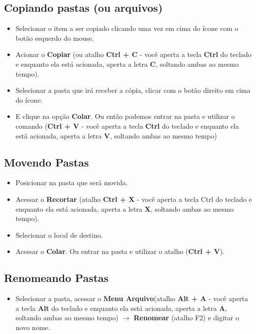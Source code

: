 \documentclass[hidelinks,12pt]{article}
\begin{document}
\subsection{Copiando pastas (ou arquivos)}

\begin{itemize}

	\item Selecionar o item a ser copiado clicando uma vez em cima do ícone com o botão esquerdo do mouse.
	\item Acionar o {\bf Copiar} (ou atalho {\bf Ctrl + C} - você aperta a tecla \textbf{Ctrl} do teclado e enquanto ela está acionada, aperta a letra {\bf C}, soltando ambas ao mesmo tempo).
	\item Selecionar a pasta que irá receber a cópia, clicar com o botão direito em cima do ícone.
	\item E clique na opção {\bf Colar}. Ou então podemos entrar na pasta e utilizar o comando ({\bf Ctrl + V} - você aperta a tecla {\bf Ctrl} do teclado e enquanto ela está acionada, aperta a letra {\bf V}, soltando ambas ao mesmo tempo)
\end{itemize}

\subsection{Movendo Pastas}

\begin{itemize}
	\item Posicionar na pasta que será movida.
	\item Acessar o {\bf Recortar} (atalho {\bf Ctrl + X} - você aperta a tecla Ctrl do teclado e enquanto ela está acionada, aperta a letra {\bf X}, soltando ambas ao mesmo tempo).
	\item Selecionar o local de destino.
	\item Acessar o {\bf Colar}. Ou entrar na pasta e utilizar o atalho ({\bf Ctrl + V}).
\end{itemize}

\subsection{Renomeando Pastas}

\begin{itemize}
	\item Selecionar a pasta, acessar o {\bf Menu Arquivo}(atalho {\bf Alt + A} - você aperta a tecla {\bf Alt} do teclado e enquanto ela está acionada, aperta a letra {\bf A}, soltando ambas ao mesmo tempo) $\rightarrow$ {\bf Renomear} (atalho F2) e digitar o novo nome.
\end{itemize}
\end{document}
